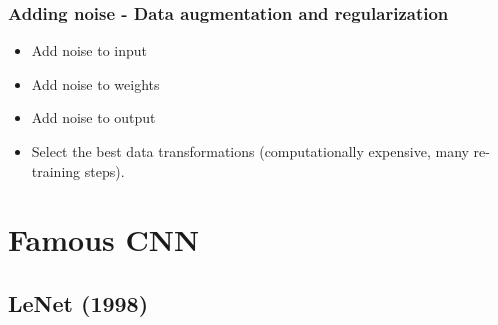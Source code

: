 \begin{frame}
	\frametitle{Adding noise - Data augmentation and regularization}


	\begin{itemize}
		\item Add noise to input

		\smallskip


		\smallskip


		\medskip

		\item Add noise to weights

		\smallskip


		\smallskip


		\medskip

		\item Add noise to output

		\smallskip


		\medskip

		\item Select the best data transformations (computationally expensive, many re-training steps).

		\smallskip

	\end{itemize}

\end{frame}




\section{Famous CNN}

\subsection{LeNet (1998)}

